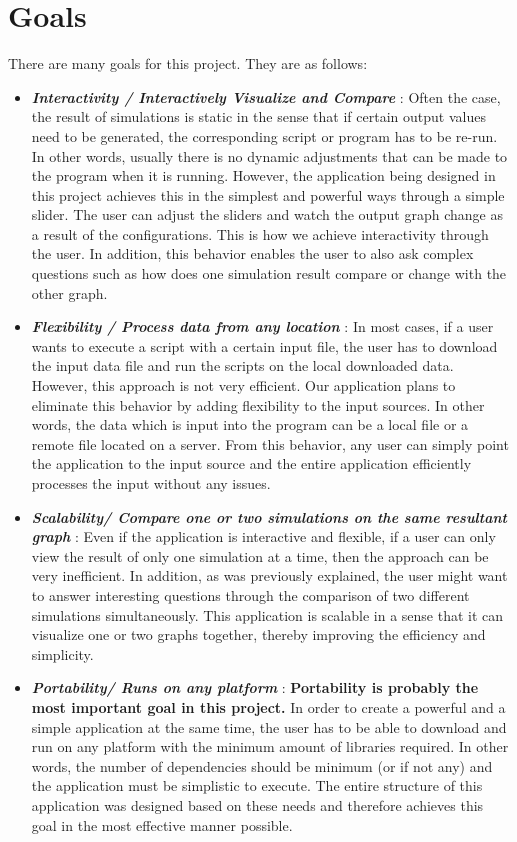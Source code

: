 \section*{Goals}

There are many goals for this project. They are as follows:

\begin{itemize}
    \item \textbf{\textit{Interactivity / Interactively Visualize and Compare} }: Often the case, the result of simulations is static in the sense that if certain output values need to be generated, the corresponding script or program has to be re-run. In other words, usually there is no dynamic adjustments that can be made to the program when it is running. However, the application being designed in this project achieves this in the simplest and powerful ways through a simple slider. The user can adjust the sliders and watch the output graph change as a result of the configurations. This is how we achieve interactivity through the user. In addition, this behavior enables the user to also ask complex questions such as how does one simulation result compare or change with the other graph.
    
    \item \textbf{\textit{Flexibility / Process data from any location} }: In most cases, if a user wants to execute a script with a certain input file, the user has to download the input data file and run the scripts on the local downloaded data. However, this approach is not very efficient. Our application plans to eliminate this behavior by adding flexibility to the input sources. In other words, the data which is input into the program can be a local file or a remote file located on a server. From this behavior, any user can simply point the application to the input source and the entire application efficiently processes the input without any issues. 
    
    \item \textbf{\textit{Scalability/ Compare one or two simulations on the same resultant graph} }: Even if the application is interactive and flexible, if a user can only view the result of only one simulation at a time, then the approach can be very inefficient. In addition, as was previously explained, the user might want to answer interesting questions through the comparison of two different simulations simultaneously. This application is scalable in a sense that it can visualize one or two graphs together, thereby improving the efficiency and simplicity. 
    
    \item \textbf{\textit{Portability/ Runs on any platform} }: \textbf{Portability is probably the most important goal in this project.} In order to create a powerful and a simple application at the same time, the user has to be able to download and run on any platform with the minimum amount of libraries required. In other words, the number of dependencies should be minimum (or if not any) and the application must be simplistic to execute. The entire structure of this application was designed based on these needs and therefore achieves this goal in the most effective manner possible.   
\end{itemize}